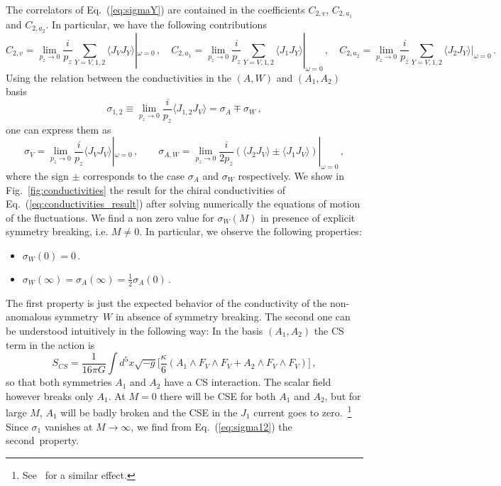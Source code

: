 \documentclass[epj]{webofc}
\begin{document}
The correlators of Eq.~(\ref{eq:sigmaY}) are contained in the coefficients $C_{2,v}$, $C_{2,a_1}$ and $C_{2,a_2}$. In particular, we have the following contributions
\begin{equation}
C_{2,v} \!=\!  \lim_{p_z \to 0} \frac{i}{p_z} \! \sum_{Y=V,1,2}  \!\!\! \langle J_V J_Y \rangle|_{\omega=0}   \,,  \quad\!\!\! C_{2,a_1} \!=\! \lim_{p_z \to 0} \frac{i}{p_z} \! \sum_{Y=V,1,2} \!\!\! \langle J_1 J_Y \rangle|_{\omega=0}   \,, \quad\!\!\! C_{2,a_2} \!=\!  \lim_{p_z \to 0} \frac{i}{p_z} \! \sum_{Y=V,1,2} \!\!\! \langle J_2 J_Y \rangle|_{\omega=0}   \,. \label{eq:Cv2}
\end{equation}
Using the relation between the conductivities in the $(A,W)$ and $(A_1,A_2)$ basis
\begin{equation}
\sigma_{1,2} \equiv \lim_{p_z \to 0} \frac{i}{p_z} \langle J_{1,2} J_V \rangle = \sigma_A \mp \sigma_W \,, \label{eq:sigma12}
\end{equation}
one can express them as
\begin{equation}
\sigma_V = \lim_{p_z \to 0} \frac{i}{p_z} \langle J_V J_V \rangle|_{\omega=0}  \,, \qquad \sigma_{A,W} = \lim_{p_z \to 0} \frac{i}{2 p_z}\left( \langle J_2 J_V \rangle \pm \langle J_1 J_V \rangle  \right)|_{\omega=0}    \,, \label{eq:conductivities_result}
\end{equation}
where the sign $\pm$ corresponds to the case $\sigma_A$ and $\sigma_W$ respectively. We show in Fig.~\ref{fig:conductivities} the result for the chiral conductivities of Eq.~(\ref{eq:conductivities_result}) after solving numerically the equations of motion of the fluctuations. We find a non zero value for $\sigma_W(M)$ in presence of explicit symmetry breaking, i.e. $M \ne 0$. In particular, we observe the following properties:
\begin{itemize}
\item $\sigma_W(0)=0\,.$
\item $\sigma_W(\infty) = \sigma_A(\infty) = \frac{1}{2} \sigma_A(0) \,.$
\end{itemize}
The first property is just the expected behavior of the conductivity of the non-anomalous symmetry~$W$ in absence of symmetry breaking. The second one can be understood intuitively in the following way: In the basis $(A_1,A_2)$ the CS term in the action is
\begin{equation}
S_{CS} = \frac{1}{16\pi G} \int d^5x \sqrt{-g} \bigg[ \frac{\kappa}{6} \left( A_1 \wedge F_V \wedge F_V   +  A_2 \wedge F_V \wedge F_V   \right) \bigg]  \,, \label{eq:SCS}
\end{equation}
so that both symmetries $A_1$ and $A_2$ have a CS interaction. The scalar field however breaks only $A_1$. At $M=0$ there will be CSE for both $A_1$ and $A_2$, but for large $M$, $A_1$ will be badly broken and the CSE in the $J_1$ current goes to zero.~\footnote{See~\cite{Jimenez-Alba:2015awa} for a similar effect.} Since $\sigma_1$ vanishes at $M \to \infty$, we find from Eq.~(\ref{eq:sigma12}) the second~property.
\end{document}
